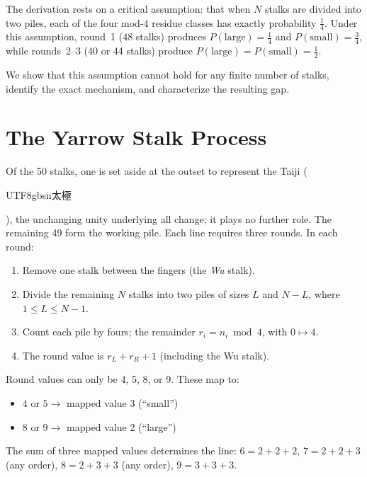 \documentclass{article}
\begin{document}
The derivation rests on a critical assumption: that when $N$ stalks are divided into two piles, each of the four mod-4 residue classes has exactly probability $\frac{1}{4}$. Under this assumption, round~1 (48 stalks) produces $P(\text{large}) = \frac{1}{4}$ and $P(\text{small}) = \frac{3}{4}$, while rounds~2--3 (40 or 44 stalks) produce $P(\text{large}) = P(\text{small}) = \frac{1}{2}$.

We show that this assumption cannot hold for any finite number of stalks, identify the exact mechanism, and characterize the resulting gap.

\section{The Yarrow Stalk Process}\label{sec:process}

Of the 50 stalks, one is set aside at the outset to represent the Taiji (\begin{CJK}{UTF8}{gbsn}太極\end{CJK}), the unchanging unity underlying all change; it plays no further role. The remaining 49 form the working pile. Each line requires three rounds. In each round:

\begin{enumerate}
\tightlist
\item Remove one stalk between the fingers (the \textit{Wu} stalk).
\item Divide the remaining $N$ stalks into two piles of sizes $L$ and $N - L$, where $1 \leq L \leq N-1$.
\item Count each pile by fours; the remainder $r_i = n_i \bmod 4$, with $0 \mapsto 4$.
\item The round value is $r_L + r_R + 1$ (including the Wu stalk).
\end{enumerate}

Round values can only be 4, 5, 8, or 9. These map to:
\begin{itemize}
\tightlist
\item $4$ or $5 \to$ mapped value 3 (``small'')
\item $8$ or $9 \to$ mapped value 2 (``large'')
\end{itemize}

The sum of three mapped values determines the line: $6 = 2{+}2{+}2$, $7 = 2{+}2{+}3$ (any order), $8 = 2{+}3{+}3$ (any order), $9 = 3{+}3{+}3$.
\end{document}
